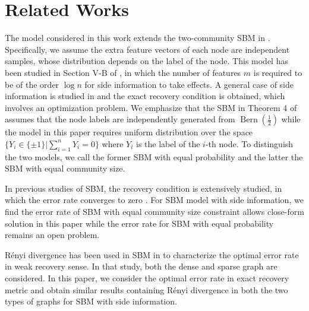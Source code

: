 \documentclass[conference,letterpaper]{IEEEtran}
\DeclareMathOperator{\Bern}{Bern}
\begin{document}
\section{Related Works}\label{s:rw}
The model considered in this work extends the two-community SBM in \cite{abbe2015community}.
Specifically, we assume the extra feature vectors of each node are independent samples, whose distribution depends on the label of the node.
This model has been studied in Section V-B of \cite{saad2018community}, in which the number of features
$m$ is required to be of the order $\log n$ for side information to take effects.
A general case of side information is studied
in \cite{abbe17sideinfo} and the exact recovery condition is obtained, which involves an optimization problem.
We emphasize that the SBM in Theorem 4 of \cite{abbe17sideinfo}
assumes that the node labels are independently generated  from $\Bern(\frac{1}{2})$ while the model
in this paper requires uniform distribution over the space $\{Y_i \in \{\pm 1\}| \sum_{i=1}^n Y_i = 0\}$ where $Y_i$ is the label of the $i$-th node.
To distinguish the two models, we call the former SBM with equal probability
and the latter the SBM with equal community size.

In previous studies of SBM, the recovery condition is extensively studied, in which the error rate converges
to zero \cite{abbe2015exact}. 
For SBM model with side information, we find the error rate of SBM with equal community size constraint allows close-form solution 
in this paper while the error rate for SBM with
equal probability remains an open problem.

Rényi divergence has been used in SBM in \cite{zhang2016} to characterize the optimal error rate in weak
recovery sense. In that study, both the dense and sparse graph are considered. In this paper, we consider the optimal error rate in exact recovery metric and obtain similar results containing
Rényi divergence
in both the two types of graphs for SBM with side information.
\end{document}
